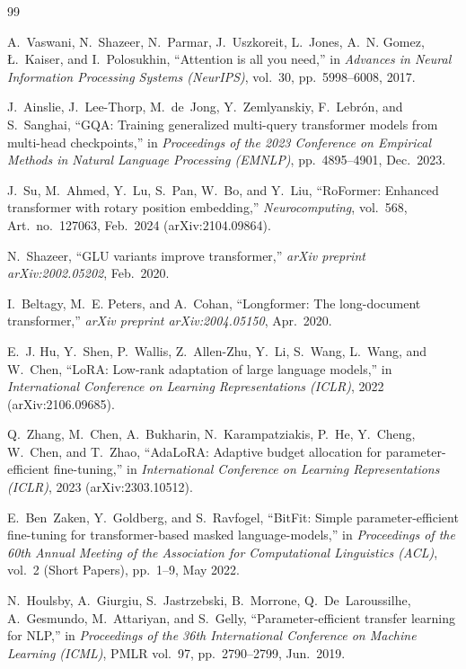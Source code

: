 \documentclass[11pt, oneside]{article}
\begin{document}
\newpage
\begin{thebibliography}{99}

A.~Vaswani, N.~Shazeer, N.~Parmar, J.~Uszkoreit, L.~Jones, A.~N. Gomez, {\L}.~Kaiser, and I.~Polosukhin, ``Attention is all you need,'' in \emph{Advances in Neural Information Processing Systems (NeurIPS)}, vol.~30, pp.~5998--6008, 2017.

J.~Ainslie, J.~Lee-Thorp, M.~de~Jong, Y.~Zemlyanskiy, F.~Lebr{\'o}n, and S.~Sanghai, ``GQA: Training generalized multi-query transformer models from multi-head checkpoints,'' in \emph{Proceedings of the 2023 Conference on Empirical Methods in Natural Language Processing (EMNLP)}, pp.~4895--4901, Dec.\ 2023.

J.~Su, M.~Ahmed, Y.~Lu, S.~Pan, W.~Bo, and Y.~Liu, ``RoFormer: Enhanced transformer with rotary position embedding,'' \emph{Neurocomputing}, vol.~568, Art.\ no.\ 127063, Feb.\ 2024 (arXiv:2104.09864).

N.~Shazeer, ``GLU variants improve transformer,'' \emph{arXiv preprint arXiv:2002.05202}, Feb.\ 2020.

I.~Beltagy, M.~E. Peters, and A.~Cohan, ``Longformer: The long-document transformer,'' \emph{arXiv preprint arXiv:2004.05150}, Apr.\ 2020.

E.~J. Hu, Y.~Shen, P.~Wallis, Z.~Allen-Zhu, Y.~Li, S.~Wang, L.~Wang, and W.~Chen, ``LoRA: Low-rank adaptation of large language models,'' in \emph{International Conference on Learning Representations (ICLR)}, 2022 (arXiv:2106.09685).

Q.~Zhang, M.~Chen, A.~Bukharin, N.~Karampatziakis, P.~He, Y.~Cheng, W.~Chen, and T.~Zhao, ``AdaLoRA: Adaptive budget allocation for parameter-efficient fine-tuning,'' in \emph{International Conference on Learning Representations (ICLR)}, 2023 (arXiv:2303.10512).

E.~Ben~Zaken, Y.~Goldberg, and S.~Ravfogel, ``BitFit: Simple parameter-efficient fine-tuning for transformer-based masked language-models,'' in \emph{Proceedings of the 60th Annual Meeting of the Association for Computational Linguistics (ACL)}, vol.~2 (Short Papers), pp.~1--9, May 2022.

N.~Houlsby, A.~Giurgiu, S.~Jastrzebski, B.~Morrone, Q.~De~Laroussilhe, A.~Gesmundo, M.~Attariyan, and S.~Gelly, ``Parameter-efficient transfer learning for NLP,'' in \emph{Proceedings of the 36th International Conference on Machine Learning (ICML)}, PMLR vol.~97, pp.~2790--2799, Jun.\ 2019.


\end{thebibliography}
\end{document}
